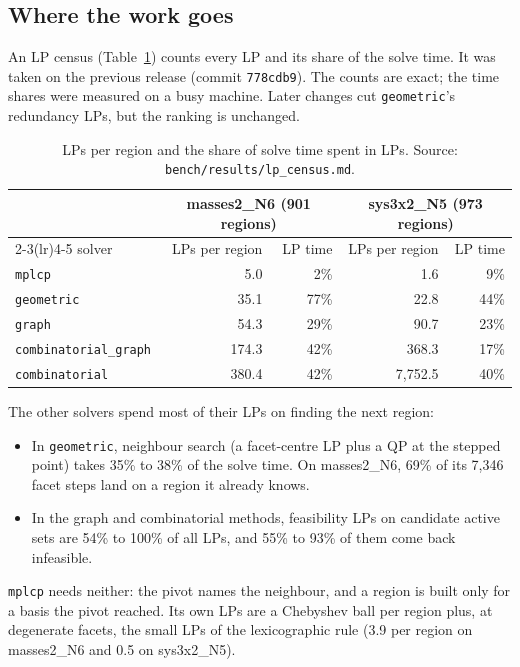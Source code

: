 \documentclass[11pt]{article}
\newcommand{\code}[1]{\texttt{#1}}
\let\oldsubsection\subsection
\renewcommand{\subsection}{\Needspace{7\baselineskip}\oldsubsection}
\begin{document}
\subsection{Where the work goes}

An LP census (Table~\ref{tab:census}) counts every LP and its share of the solve time. It was taken on the previous
release (commit \code{778cdb9}). The counts are exact; the time shares were measured on a busy machine. Later changes
cut \code{geometric}'s redundancy LPs, but the ranking is unchanged.

\begin{table}[H]
\centering\small
\caption{LPs per region and the share of solve time spent in LPs. Source: \code{bench/results/lp\_census.md}.}
\label{tab:census}
\begin{tabular}{@{}lrrrr@{}}
\toprule
& \multicolumn{2}{c}{masses2\_N6 (901 regions)} & \multicolumn{2}{c}{sys3x2\_N5 (973 regions)} \\
\cmidrule(lr){2-3}\cmidrule(lr){4-5}
solver & LPs per region & LP time & LPs per region & LP time \\
\midrule
\code{mplcp} & 5.0 & 2\% & 1.6 & 9\% \\
\code{geometric} & 35.1 & 77\% & 22.8 & 44\% \\
\code{graph} & 54.3 & 29\% & 90.7 & 23\% \\
\code{combinatorial\_graph} & 174.3 & 42\% & 368.3 & 17\% \\
\code{combinatorial} & 380.4 & 42\% & 7,752.5 & 40\% \\
\bottomrule
\end{tabular}
\end{table}

\noindent The other solvers spend most of their LPs on finding the next region:
\begin{itemize}
  \item In \code{geometric}, neighbour search (a facet-centre LP plus a QP at the stepped point) takes 35\% to 38\%
  of the solve time. On masses2\_N6, 69\% of its 7,346 facet steps land on a region it already knows.
  \item In the graph and combinatorial methods, feasibility LPs on candidate active sets are 54\% to 100\% of all
  LPs, and 55\% to 93\% of them come back infeasible.
\end{itemize}
\code{mplcp} needs neither: the pivot names the neighbour, and a region is built only for a basis the pivot reached.
Its own LPs are a Chebyshev ball per region plus, at degenerate facets, the small LPs of the lexicographic rule
(3.9 per region on masses2\_N6 and 0.5 on sys3x2\_N5).
\end{document}
